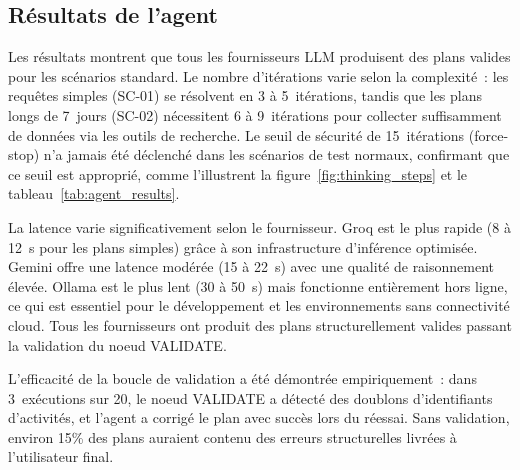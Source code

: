 \subsection{Résultats de l'agent}

Les résultats montrent que tous les fournisseurs LLM produisent des plans valides pour les
scénarios standard. Le nombre d'itérations varie selon la complexité~: les requêtes simples
(SC-01) se résolvent en 3 à 5~itérations, tandis que les plans longs de 7~jours (SC-02)
nécessitent 6 à 9~itérations pour collecter suffisamment de données via les outils de
recherche. Le seuil de sécurité de 15~itérations (force-stop) n'a jamais été déclenché dans
les scénarios de test normaux, confirmant que ce seuil est approprié, comme l'illustrent la figure~\ref{fig:thinking_steps} et le tableau~\ref{tab:agent_results}.

La latence varie significativement selon le fournisseur. Groq est le plus rapide (8 à 12~s
pour les plans simples) grâce à son infrastructure d'inférence optimisée. Gemini offre une
latence modérée (15 à 22~s) avec une qualité de raisonnement élevée. Ollama est le plus
lent (30 à 50~s) mais fonctionne entièrement hors ligne, ce qui est essentiel pour le
développement et les environnements sans connectivité cloud. Tous les fournisseurs ont
produit des plans structurellement valides passant la validation du noeud VALIDATE.

L'efficacité de la boucle de validation a été démontrée empiriquement~: dans 3~exécutions
sur 20, le noeud VALIDATE a détecté des doublons d'identifiants d'activités, et l'agent a
corrigé le plan avec succès lors du réessai. Sans validation, environ 15\% des plans auraient
contenu des erreurs structurelles livrées à l'utilisateur final.

